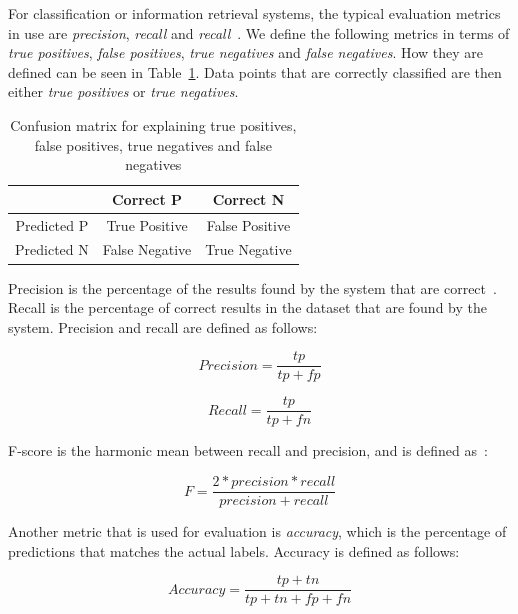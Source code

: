 For classification or information retrieval systems, the typical evaluation metrics in use are \textit{precision}, \textit{recall} and \textit{recall}~\cite{jiang2012information}.
We define the following metrics in terms of \textit{true positives}, \textit{false positives}, \textit{true negatives} and \textit{false negatives}.
How they are defined can be seen in Table~\ref{tab:conf-matr}.
Data points that are correctly classified are then either \textit{true positives} or \textit{true negatives}.

\begin{table}
    \begin{center}
        \begin{tabular}{c c c}
            & Correct P & Correct N \\
            \toprule
            Predicted P & True Positive & False Positive \\
            Predicted N & False Negative & True Negative \\
        \end{tabular}
    \end{center}
    \caption{Confusion matrix for explaining true positives, false positives, true negatives and false negatives}\label{tab:conf-matr}
\end{table}

Precision is the percentage of the results found by the system that are correct~\cite{tjong2003introduction}.
Recall is the percentage of correct results in the dataset that are found by the system.
Precision and recall are defined as follows:

\begin{equation}
    Precision = \frac{tp}{tp+fp}
\end{equation}

\begin{equation}
    Recall = \frac{tp}{tp+fn}
\end{equation}

F-score is the harmonic mean between recall and precision, and is defined as~\cite{tjong2003introduction}:

\begin{equation}
    F = \frac{2*precision*recall}{precision+recall}
\end{equation}

Another metric that is used for evaluation is \textit{accuracy}, which is the percentage of predictions that matches the actual labels.
Accuracy is defined as follows:

\begin{equation}
    Accuracy = \frac{tp+tn}{tp+tn+fp+fn}
\end{equation}

